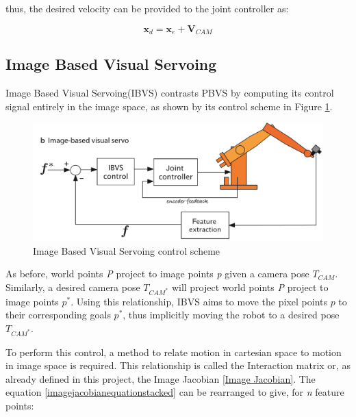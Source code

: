 \documentclass{UoNMCHA}
\numberwithin{equation}{section}
\begin{document}
thus, the desired velocity can be provided to the joint controller as:

\begin{equation}
	\mathbf{x}_{d} = \mathbf{x}_{e} + {\mathbf{V}}_{CAM} 
\end{equation}


\subsection{Image Based Visual Servoing}\label{Image Based Visual Servoing}

Image Based Visual Servoing(IBVS) contrasts PBVS by computing its control signal entirely in the image space, as shown by its control scheme in Figure \ref{fig:IBVScontrolscheme}. 

\begin{figure}[H]
	\begin{center}
		\includegraphics[width=.8\linewidth]{Figures/IBVScontrolscheme}
		\caption{Image Based Visual Servoing control scheme}
		\label{fig:IBVScontrolscheme}
	\end{center}
\end{figure}

As before, world points \textit{P} project to image points \textit{p} given a camera pose $T_{CAM}$. Similarly, a desired camera pose $T_{CAM^{*}}$ will project world points \textit{P} project to image points $p^{*}$. Using this relationship, IBVS aims to move the pixel points $p$ to their corresponding goals $p^{*}$, thus implicitly moving the robot to a desired pose $T_{CAM^{*}}$.	

To perform this control, a method to relate motion in cartesian space to motion in image space is required. This relationship is called the Interaction matrix or, as already defined in this project, the Image Jacobian \ref{Image Jacobian}. The equation \ref{imagejacobianequationstacked} can be rearranged to give, for \textit{n} feature points:
\end{document}
